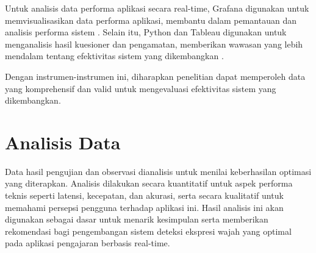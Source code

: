 Untuk analisis data performa aplikasi secara real-time, Grafana digunakan untuk memvisualisasikan data performa aplikasi, membantu dalam pemantauan dan analisis performa sistem \parencite{ogundeyiWebSocketRealTime2019}. Selain itu, Python dan Tableau digunakan untuk menganalisis hasil kuesioner dan pengamatan, memberikan wawasan yang lebih mendalam tentang efektivitas sistem yang dikembangkan \parencite{fowdurRealtimeMachineLearning2024}.

Dengan instrumen-instrumen ini, diharapkan penelitian dapat memperoleh data yang komprehensif dan valid untuk mengevaluasi efektivitas sistem yang dikembangkan.

\section{Analisis Data}
Data hasil pengujian dan observasi dianalisis untuk menilai keberhasilan optimasi yang diterapkan. Analisis dilakukan secara kuantitatif untuk aspek performa teknis seperti latensi, kecepatan, dan akurasi, serta secara kualitatif untuk memahami persepsi pengguna terhadap aplikasi ini. Hasil analisis ini akan digunakan sebagai dasar untuk menarik kesimpulan serta memberikan rekomendasi bagi pengembangan sistem deteksi ekspresi wajah yang optimal pada aplikasi pengajaran berbasis real-time.
